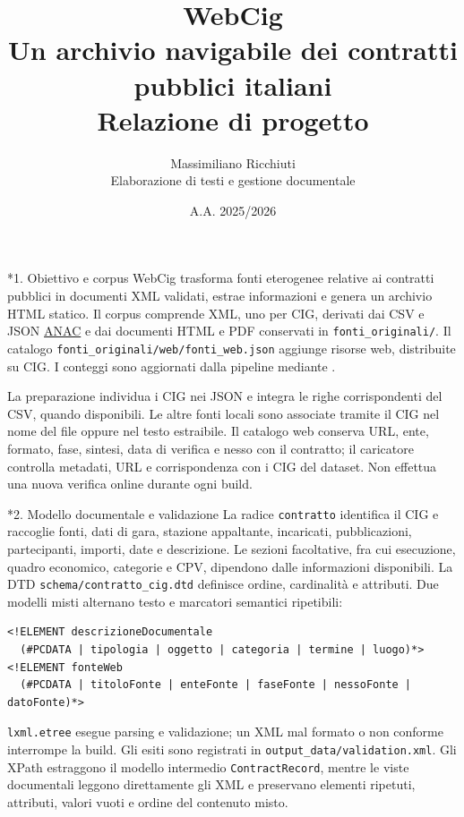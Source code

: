 \documentclass[10pt,a4paper]{article}
\title{\vspace{-1.2cm}\textbf{WebCig}\\[2pt]\large Un archivio navigabile dei contratti pubblici italiani\\Relazione di progetto}
\author{Massimiliano Ricchiuti\\Elaborazione di testi e gestione documentale}
\date{A.A. 2025/2026}
\makeatletter
\newcommand{\code}[1]{\texttt{#1}}
\newcommand{\anac}{\href{https://www.anticorruzione.it/-/piattaforma-contratti-pubblici}{ANAC}}
\renewcommand\section{\@startsection{section}{1}{0pt}{8pt}{4pt}{\large\bfseries}}
\makeatother
\begin{document}
\maketitle
\vspace{-1.0cm}

\section*{1. Obiettivo e corpus}
WebCig trasforma fonti eterogenee relative ai contratti pubblici in documenti XML validati, estrae informazioni e genera un archivio HTML statico. Il corpus comprende \numeroContratti{} XML, uno per CIG, derivati dai CSV e JSON \anac{} e dai documenti HTML e PDF conservati in \code{fonti\_originali/}. Il catalogo \code{fonti\_originali/web/fonti\_web.json} aggiunge \numeroFontiWeb{} risorse web, distribuite su \contrattiConFontiWeb{} CIG. I conteggi sono aggiornati dalla pipeline mediante .

La preparazione individua i CIG nei JSON e integra le righe corrispondenti del CSV, quando disponibili. Le altre fonti locali sono associate tramite il CIG nel nome del file oppure nel testo estraibile. Il catalogo web conserva URL, ente, formato, fase, sintesi, data di verifica e nesso con il contratto; il caricatore controlla metadati, URL e corrispondenza con i CIG del dataset. Non effettua una nuova verifica online durante ogni build.

\section*{2. Modello documentale e validazione}
La radice \code{contratto} identifica il CIG e raccoglie fonti, dati di gara, stazione appaltante, incaricati, pubblicazioni, partecipanti, importi, date e descrizione. Le sezioni facoltative, fra cui esecuzione, quadro economico, categorie e CPV, dipendono dalle informazioni disponibili. La DTD \code{schema/contratto\_cig.dtd} definisce ordine, cardinalità e attributi. Due modelli misti alternano testo e marcatori semantici ripetibili:
\begin{verbatim}
<!ELEMENT descrizioneDocumentale
  (#PCDATA | tipologia | oggetto | categoria | termine | luogo)*>
<!ELEMENT fonteWeb
  (#PCDATA | titoloFonte | enteFonte | faseFonte | nessoFonte | datoFonte)*>
\end{verbatim}
\code{lxml.etree} esegue parsing e validazione; un XML mal formato o non conforme interrompe la build. Gli esiti sono registrati in \code{output\_data/validation.xml}. Gli XPath estraggono il modello intermedio \code{ContractRecord}, mentre le viste documentali leggono direttamente gli XML e preservano elementi ripetuti, attributi, valori vuoti e ordine del contenuto misto.
\end{document}

